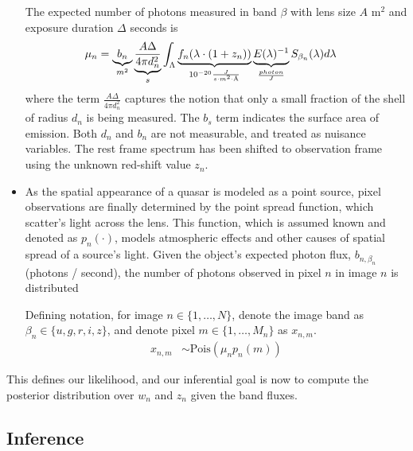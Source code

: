 \documentclass[11pt]{article}
\newcommand{\angstrom}{\text{\normalfont\AA}}
\begin{document}
\begin{itemize}
The expected number of photons measured in band $\beta$ with lens size $A$ m$^2$ and exposure duration $\Delta$ seconds is
\begin{align}
  \mu_{n} &= 
    \underbrace{ b_n }_{ m^2 }
    \underbrace{ \frac{A \Delta}{4 \pi d_n^2} }_{ s }  
    \int_{\Lambda}
    \underbrace{ f_n(\lambda \cdot ( 1 + z_n ))}_{10^{-20} \frac{J}{s \cdot m^2 \cdot \angstrom} }
    \underbrace{ E(\lambda)^{-1} }_{ \frac{photon}{J} }
    S_{\beta_n}(\lambda) d\lambda
\end{align}
where the term $\frac{A \Delta}{4 \pi d_n^2}$ captures the notion that only a small fraction of the shell of radius $d_n$ is being measured.  The $b_s$ term indicates the surface area of emission.  Both $d_n$ and $b_n$ are not measurable, and treated as nuisance variables.  The rest frame spectrum has been shifted to observation frame using the unknown red-shift value $z_n$.  



\item As the spatial appearance of a quasar is modeled as a point source, pixel observations are finally determined by the point spread function, which scatter's light across the lens.   
This function, which is assumed known and denoted as $p_n(\cdot)$, models atmospheric effects and other causes of spatial spread of a source's light.  Given the object's expected photon flux, $b_{n, \beta_n}$ (photons / second), the number of photons observed in pixel $n$ in image $n$ is distributed
 
Defining notation, for image $n \in \{1, \dots, N\}$, denote the image band as $\beta_n \in \{u, g, r, i, z\}$, and denote pixel $m \in \{1, \dots, M_n\}$ as $x_{n,m}$. 
\begin{align}
  x_{n,m} &\sim \textrm{Pois}( \mu_n p_n(m) )
\end{align}

\end{itemize}

This defines our likelihood, and our inferential goal is now to compute the posterior distribution over $w_n$ and $z_n$ given the band fluxes.  

\subsection{Inference}
\end{document}
